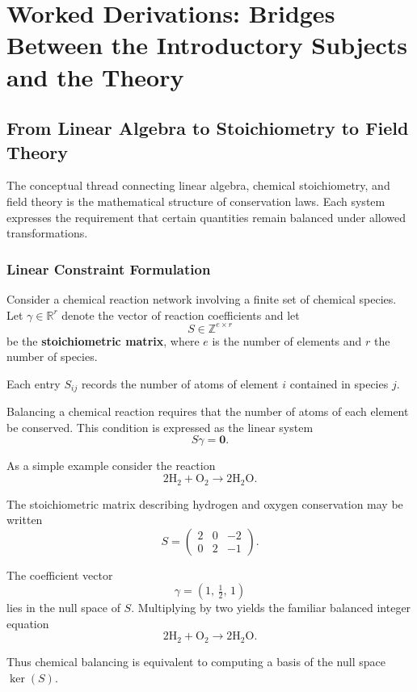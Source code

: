 \documentclass[11pt, openany]{book}
\theoremstyle{plain}
\theoremstyle{definition}
\theoremstyle{remark}
\begin{document}
\chapter{Worked Derivations: Bridges Between the Introductory Subjects and the Theory}

\section{From Linear Algebra to Stoichiometry to Field Theory}

The conceptual thread connecting linear algebra, chemical stoichiometry,
and field theory is the mathematical structure of conservation laws.
Each system expresses the requirement that certain quantities remain
balanced under allowed transformations.

\subsection*{Linear Constraint Formulation}

Consider a chemical reaction network involving a finite set of chemical
species.  Let $\gamma\in\mathbb{R}^r$ denote the vector of reaction
coefficients and let
\[
S\in\mathbb{Z}^{e\times r}
\]
be the \textbf{stoichiometric matrix}, where $e$ is the number of
elements and $r$ the number of species.

Each entry $S_{ij}$ records the number of atoms of element $i$
contained in species $j$.

Balancing a chemical reaction requires that the number of atoms of each
element be conserved.  This condition is expressed as the linear system
\[
S\gamma=\mathbf{0}.
\]

As a simple example consider the reaction
\[
2\mathrm{H_2}+ \mathrm{O_2}\rightarrow 2\mathrm{H_2O}.
\]

The stoichiometric matrix describing hydrogen and oxygen conservation
may be written
\[
S=
\begin{pmatrix}
2 & 0 & -2 \\
0 & 2 & -1
\end{pmatrix}.
\]

The coefficient vector
\[
\gamma=(1,\,\tfrac12,\,1)
\]
lies in the null space of $S$.  Multiplying by two yields the familiar
balanced integer equation
\[
2\mathrm{H_2}+ \mathrm{O_2}\rightarrow 2\mathrm{H_2O}.
\]

Thus chemical balancing is equivalent to computing a basis of the null
space $\ker(S)$.
\end{document}
